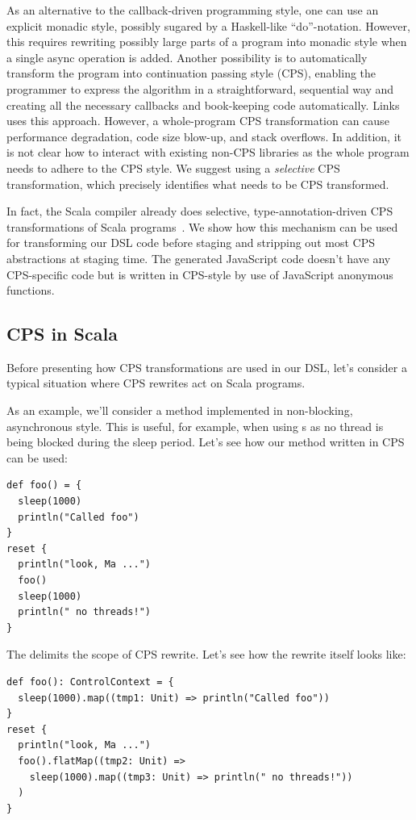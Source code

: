 \documentclass[runningheads,a4paper]{llncs}
\begin{document}
As an alternative to the callback-driven programming style, one can use an explicit monadic style, possibly sugared by a Haskell-like ``do''-notation. However, this requires rewriting possibly large parts of a program into monadic style when a single async operation is added. Another possibility is to automatically transform the program into continuation passing style (CPS), enabling the programmer to express the algorithm in a straightforward, sequential way and creating all the necessary callbacks and book-keeping code automatically. Links~\cite{links} uses this approach. However, a whole-program CPS transformation can cause performance degradation, code size blow-up, and stack overflows. In addition, it is not clear how to interact with existing non-CPS libraries as the whole program needs to adhere to the CPS style. We suggest using a {\it selective} CPS transformation, which precisely identifies what needs to be CPS transformed.

In fact, the Scala compiler already does selective,  type-annotation-driven CPS transformations of Scala programs~\cite{cps-scala,danvy90,danvy92}. We show how this mechanism can be used for transforming our DSL code before staging and stripping out most CPS abstractions at staging time. The generated JavaScript code doesn't have any CPS-specific code but is written in CPS-style by use of JavaScript anonymous functions.

\subsection{CPS in Scala}
Before presenting how CPS transformations are used in our DSL, let's consider a typical situation where CPS rewrites act on Scala programs.

As an example, we'll consider a  method implemented in non-blocking, asynchronous style. This is useful, for example, when using s as no thread is being blocked during the sleep period. Let's see how our  method written in CPS can be used:

\begin{lstlisting}
def foo() = {
  sleep(1000)
  println("Called foo")
}
reset {
  println("look, Ma ...")
  foo()
  sleep(1000)
  println(" no threads!")
}
\end{lstlisting}

The  delimits the scope of CPS rewrite. Let's see how the rewrite itself looks like:

\begin{lstlisting}
def foo(): ControlContext = {
  sleep(1000).map((tmp1: Unit) => println("Called foo"))
}
reset {
  println("look, Ma ...")
  foo().flatMap((tmp2: Unit) =>
    sleep(1000).map((tmp3: Unit) => println(" no threads!"))
  )
}
\end{lstlisting}
\end{document}
